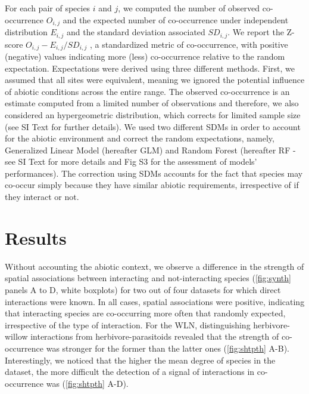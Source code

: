 For each pair of species \(i\) and \(j\), we computed the number of
observed co-occurrence \(O_{i,j}\) and the expected number of
co-occurrence under independent distribution \(E_{i,j}\) and the
standard deviation associated \(SD_{i,j}\). We report the Z-score
\(O_{i,j}-E_{i,j}/SD_{i,j}\) \citep{Gilpin1982}, a standardized metric
of co-occurrence, with positive (negative) values indicating more (less)
co-occurrence relative to the random expectation. Expectations were
derived using three different methods. First, we assumed that all sites
were equivalent, meaning we ignored the potential influence of abiotic
conditions across the entire range. The observed co-occurrence is an
estimate computed from a limited number of observations
\citep{Gilpin1982, Veech2013} and therefore, we also considered an
hypergeometric distribution, which corrects for limited sample size (see
SI Text for further details). We used two different SDMs in order to
account for the abiotic environment and correct the random expectations,
namely, Generalized Linear Model (hereafter GLM) and Random Forest
(hereafter RF - see SI Text for more details and Fig S3 for the
assessment of models' performances). The correction using SDMs accounts
for the fact that species may co-occur simply because they have similar
abiotic requirements, irrespective of if they interact or not.

\section{Results}\label{results}

Without accounting the abiotic context, we observe a difference in the
strength of spatial associations between interacting and not-interacting
species (\ref{fig:synth} panels A to D, white boxplots) for two out of
four datasets for which direct interactions were known. In all cases,
spatial associations were positive, indicating that interacting species
are co-occurring more often that randomly expected, irrespective of the
type of interaction. For the WLN, distinguishing herbivore-willow
interactions from herbivore-parasitoids revealed that the strength of
co-occurrence was stronger for the former than the latter ones
(\ref{fig:shtpth} A-B). Interestingly, we noticed that the higher the
mean degree of species in the dataset, the more difficult the detection
of a signal of interactions in co-occurrence was (\ref{fig:shtpth} A-D).

